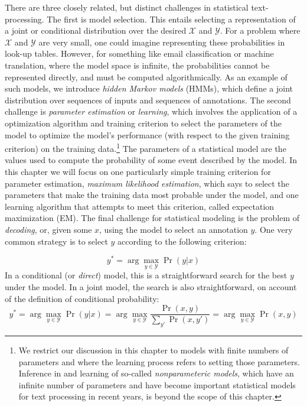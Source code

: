 There are three closely related, but distinct challenges in
statistical text-processing.  The first is model selection.  This
entails selecting a representation of a joint or conditional
distribution over the desired $\mathcal{X}$ and $\mathcal{Y}$.  For a
problem where $\mathcal{X}$ and $\mathcal{Y}$ are very small, one
could imagine representing these probabilities in look-up tables.
However, for something like email classification or machine
translation, where the model space is infinite, the probabilities
cannot be represented directly, and must be computed algorithmically.
As an example of such models, we introduce \emph{hidden Markov models}
(HMMs), which define a joint distribution over sequences of inputs and
sequences of annotations.  The second challenge is \emph{parameter
  estimation} or \emph{learning}, which involves the application of a
optimization algorithm and training criterion to select the parameters
of the model to optimize the model's performance (with respect to the
given training criterion) on the training data.\footnote{We restrict
  our discussion in this chapter to models with finite numbers of
  parameters and where the learning process refers to setting those
  parameters. Inference in and learning of so-called
  \emph{nonparameteric models}, which have an infinite number of
  parameters and have become important statistical models for text
  processing in recent years, is beyond the scope of this chapter.}
The parameters of a statistical model are the values used to compute
the probability of some event described by the model.  In this chapter
we will focus on one particularly simple training criterion for
parameter estimation, \emph{maximum likelihood estimation}, which says
to select the parameters that make the training data most probable
under the model, and one learning algorithm that attempts to meet this
criterion, called expectation maximization (EM).  The final challenge
for statistical modeling is the problem of \emph{decoding}, or, given
some $x$, using the model to select an annotation $y$.  One very
common strategy is to select $y$ according to the following criterion:

\begin{equation}
y^* = \arg \max_{y \in \mathcal{Y}} \Pr(y | x)
\end{equation}
In a conditional (or \emph{direct}) model, this is a straightforward search for the best $y$ under the model.  In a joint model, the search is also straightforward, on account of the definition of conditional probability:
\begin{equation}
y^* = \arg \max_{y \in \mathcal{Y}} \Pr(y|x) = \arg \max_{y \in \mathcal{Y}} \frac{\Pr(x,y)}{\sum_{y'}\Pr(x,y')} = \arg \max_{y \in \mathcal{Y}} \Pr(x,y) 
\end{equation}

